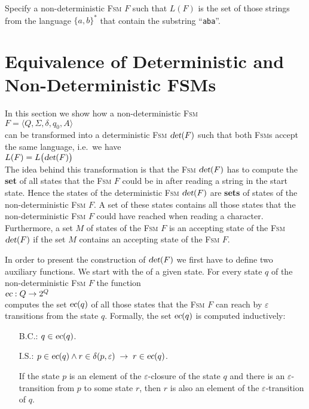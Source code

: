 \exerciseEng
Specify a non-deterministic \textsc{Fsm} $F$ such that $L(F)$ is the set of those
strings from the language  $\{a,b\}^*$ that contain the substring ``\texttt{aba}''. \eox

\section{Equivalence of  Deterministic and Non-Deterministic  FSMs}
In this section we show how a non-deterministic \textsc{Fsm} 
\\[0.2cm]
\hspace*{1.3cm}
$F = \langle Q, \Sigma, \delta, q_0, A \rangle$ 
\\[0.2cm]
can be transformed into a deterministic \textsc{Fsm} $\textsl{det}(F)$ such that both \textsc{Fsm}s accept the
same language, i.e.~we have
\\[0.2cm]
\hspace*{1.3cm}
$L(F) = L\bigl(\textsl{det}(F)\bigr)$
\\[0.2cm]
The idea behind this transformation is that the \textsc{Fsm} $\textsl{det}(F)$ has to compute the \textbf{set} of all states that the
\textsc{Fsm} $F$ could be in after reading a string in the start state.   Hence the states of the deterministic
\textsc{Fsm} $\textsl{det}(F)$ are  \textbf{sets} of states of the non-deterministic \textsc{Fsm} $F$.  A set
of these states contains all those  
states that the non-deterministic \textsc{Fsm} $F$ could have reached when reading a character.
Furthermore, a set $M$ of states of the \textsc{Fsm} $F$ is an accepting state of the \textsc{Fsm}
$\textsl{det}(F)$ if the set $M$ contains an accepting state of the \textsc{Fsm} $F$.

In order to present the construction of $\textsl{det}(F)$ we first have to define two auxiliary functions.
We start with the   of a given state.  For every state
$q$ of the non-deterministic \textsc{Fsm} $F$ the function
\\[0.2cm]
\hspace*{1.3cm}
$\textsl{ec}: Q \rightarrow 2^Q$
\\[0.2cm]
computes the set $\textsl{ec}(q)$ of all those states that the \textsc{Fsm} $F$ can reach by $\varepsilon$
transitions from the state $q$.   Formally, the set $\textsl{ec}(q)$ is computed inductively:
\begin{enumerate}
\item[B.C.:] $q \in \textsl{ec}(q)$.
\item[I.S.:] $p \in \textsl{ec}(q) \wedge r \in \delta(p, \varepsilon) \;\rightarrow\; r \in \textsl{ec}(q)$.
 
             If the state $p$ is an element of the $\varepsilon$-closure of the state $q$ and there is an
             $\varepsilon$-transition from $p$ to some state $r$, then $r$ is also an element
             of the $\varepsilon$-transition of $q$. 
\end{enumerate}


